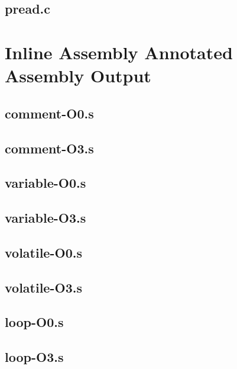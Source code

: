 \begin{appendices}
\section{pread.c}


\chapter{Inline Assembly Annotated Assembly Output}
\label{app:inlineAnnotatedAssembly}
\lstset{language=[x64]Assembler}
\section{comment-O0.s}

\section{comment-O3.s}


\section{variable-O0.s}

\section{variable-O3.s}


\section{volatile-O0.s}

\section{volatile-O3.s}


\section{loop-O0.s}

\section{loop-O3.s}



\end{appendices}
